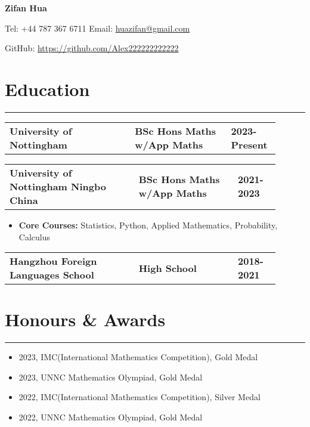 \documentclass{article}
\begin{document}
\begin{center}
    \textbf{\Large Zifan Hua}
\end{center}

\begin{center}
    Tel: +44 787 367 6711 Email: \href{mailto:huazifan@gmail.com}{huazifan@gmail.com}

    GitHub: \href{https://github.com/Alex222222222222}{https://github.com/Alex222222222222}
\end{center}

\section*{Education}
    \hrule
    \vspace{0.5em}

    \noindent
    \begin{tabular}{p{0.43\linewidth} p{0.33\linewidth} R{0.14\linewidth}}
        \textbf{University of Nottingham} & \textbf{BSc Hons Maths w/App Maths} & \textbf{2023-Present}
    \end{tabular}

    \noindent
    \begin{tabular}{p{0.43\linewidth} p{0.33\linewidth} R{0.14\linewidth}}
        \textbf{University of Nottingham Ningbo China} & \textbf{BSc Hons Maths w/App Maths} & \textbf{2021-2023}
    \end{tabular}
    \noindent
    \begin{itemize}[topsep=0.0em,itemsep=0.0em,parsep=0.0em]
        \item \textbf{Core Courses:} Statistics, Python, Applied Mathematics, Probability, Calculus
    \end{itemize}

    \noindent
    \begin{tabular}{p{0.43\linewidth} p{0.33\linewidth} R{0.14\linewidth}}
        \textbf{Hangzhou Foreign Languages School} & \textbf{High School} & \textbf{2018-2021}
    \end{tabular}

\section*{Honours \& Awards}
    \hrule
    \vspace{0.5em}
    \begin{itemize}[topsep=0.0em,itemsep=0.0em,parsep=0.0em]
        \item 2023, IMC(International Mathematics Competition), Gold Medal
        \item 2023, UNNC Mathematics Olympiad, Gold Medal
        \item 2022, IMC(International Mathematics Competition), Silver Medal
        \item 2022, UNNC Mathematics Olympiad, Gold Medal
    \end{itemize}
\end{document}
